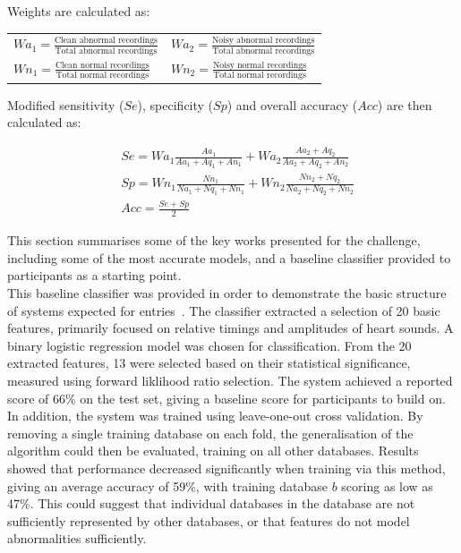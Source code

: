 \documentclass[titlepage, 12pt]{scrartcl} \usepackage{enumitem}
\begin{document}
\doublespacing

Weights are calculated as:
\begin{table}[H]
\centering
\doublespacing
\begin{tabular}{ll}
$Wa_1 = \frac{\text{Clean abnormal recordings}}{\text{Total abnormal recordings}}$ & $Wa_2 = \frac{\text{Noisy abnormal recordings}}{\text{Total abnormal recordings}}$ \\
$Wn_1 = \frac{\text{Clean normal recordings}}{\text{Total normal recordings}}$     & $Wn_2 = \frac{\text{Noisy normal recordings}}{\text{Total normal recordings}}$
\end{tabular}
\end{table}

Modified sensitivity ($Se$), specificity ($Sp$) and overall accuracy ($Acc$) are then calculated as:

\begin{align*}
    &Se=Wa_1\frac{Aa_1}{Aa_1+Aq_1+An_1}+Wa_2\frac{Aa_2+Aq_2}{Aa_2+Aq_2+An_2} \\
    &Sp=Wn_1\frac{Nn_1}{Na_1+Nq_1+Nn_1}+Wn_2\frac{Nn_2+Nq_2}{Na_2+Nq_2+Nn_2} \\
    &Acc=\frac{Se+Sp}{2}
\end{align*}

This section summarises some of the key works presented for the challenge,
including some of the most accurate models, and a baseline classifier
provided to participants as a starting point.\\

This baseline classifier was provided in order to demonstrate the basic
structure of systems expected for entries~\parencite{Liu2016}. The classifier
extracted a selection of 20 basic features, primarily focused on relative
timings and amplitudes of heart sounds.  A binary logistic regression model was
chosen for classification. From the 20 extracted features, 13 were selected
based on their statistical significance, measured using forward liklihood ratio
selection. The system achieved a reported score of 66\% on the test set, giving
a baseline score for participants to build on.  In addition, the system was
trained using leave-one-out cross validation. By removing a single training
database on each fold, the generalisation of the algorithm could then be
evaluated, training on all other databases. Results showed that performance
decreased significantly when training via this method, giving an average
accuracy of 59\%, with training database $b$ scoring as low as 47\%.  This
could suggest that individual databases in the database are not sufficiently
represented by other databases, or that features do not model abnormalities
sufficiently.\\
\end{document}
